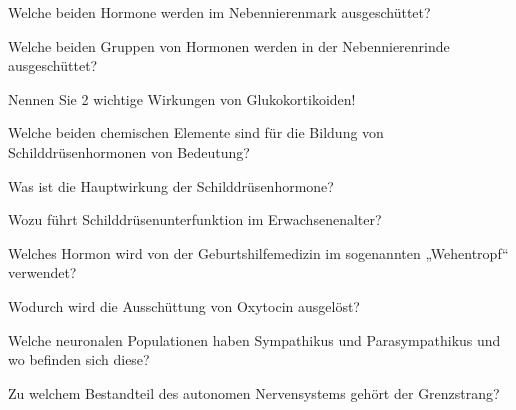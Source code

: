 \documentclass[10pt, a4paper]{exam}
\begin{document}
\begin{questions}
  \question Welche beiden Hormone werden im Nebennierenmark ausgeschüttet?
  \begin{solution}

  \end{solution}

  \question Welche beiden Gruppen von Hormonen werden in der Nebennierenrinde ausgeschüttet?
  \begin{solution}

  \end{solution}

  \question Nennen Sie 2 wichtige Wirkungen von Glukokortikoiden!
  \begin{solution}

  \end{solution}

  \question Welche beiden chemischen Elemente sind für die Bildung von Schilddrüsenhormonen von Bedeutung?
  \begin{solution}

  \end{solution}

  \question Was ist die Hauptwirkung der Schilddrüsenhormone?
  \begin{solution}

  \end{solution}

  \question Wozu führt Schilddrüsenunterfunktion im Erwachsenenalter?
  \begin{solution}

  \end{solution}

  \question Welches Hormon wird von der Geburtshilfemedizin im sogenannten „Wehentropf“ verwendet?
  \begin{solution}

  \end{solution}

  \question Wodurch wird die Ausschüttung von Oxytocin ausgelöst?
  \begin{solution}

  \end{solution}

  \question Welche neuronalen Populationen haben Sympathikus und Parasympathikus und wo befinden sich diese?
  \begin{solution}

  \end{solution}

  \question Zu welchem Bestandteil des autonomen Nervensystems gehört der Grenzstrang?
  \begin{solution}


\end{solution}
\end{questions}
\end{document}
